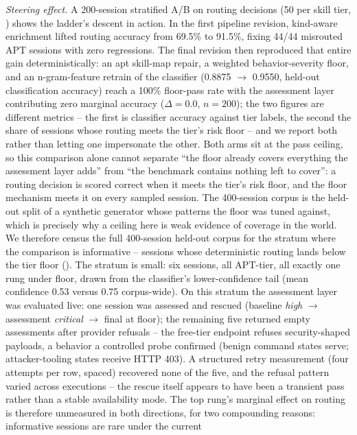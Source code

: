 \emph{Steering effect.} A 200-session stratified A/B on routing decisions
(50 per skill tier, ) shows the ladder's descent
in action. In the first pipeline revision, kind-aware enrichment lifted
routing accuracy from 69.5\% to 91.5\%, fixing 44/44 misrouted APT
sessions with zero regressions. The final revision then reproduced that
entire gain deterministically: an apt skill-map repair, a weighted
behavior-severity floor, and an n-gram-feature retrain of the classifier
(0.8875 $\to$ 0.9550, held-out classification accuracy) reach a
100\% floor-pass rate with the assessment layer contributing
zero marginal accuracy ($\Delta = 0.0$, $n=200$); the two figures are
different metrics -- the first is classifier accuracy against tier
labels, the second the share of sessions whose routing meets the tier's
risk floor -- and we report both rather than letting one impersonate the
other. Both arms sit at the
pass ceiling, so this comparison alone cannot separate ``the floor
already covers everything the assessment layer adds'' from ``the
benchmark contains nothing left to cover'': a routing decision is scored
correct when it meets the tier's risk floor, and the floor mechanism
meets it on every sampled session. The 400-session corpus is the
held-out split of a synthetic generator whose patterns the floor was
tuned against, which is precisely why a ceiling here is weak evidence
of coverage in the world. We therefore census the full
400-session held-out corpus for the stratum where the comparison is
informative -- sessions whose deterministic routing lands below the tier
floor (). The stratum is small: six sessions,
all APT-tier, all exactly one rung under floor, drawn from the
classifier's lower-confidence tail (mean confidence 0.53 versus 0.75
corpus-wide). On this stratum the assessment layer was evaluated live:
one session was assessed and rescued (baseline \emph{high} $\to$
assessment \emph{critical} $\to$ final at floor); the remaining five
returned empty assessments after provider refusals -- the free-tier
endpoint refuses security-shaped payloads, a behavior a controlled
probe confirmed (benign command states serve; attacker-tooling states
receive HTTP 403). A structured retry measurement (four attempts per
row, spaced) recovered none of the five, and the refusal pattern
varied across executions -- the rescue itself appears to have been a
transient pass rather than a stable availability mode. The top rung's marginal
effect on routing is therefore unmeasured in both directions, for two
compounding reasons: informative sessions are rare under the current
